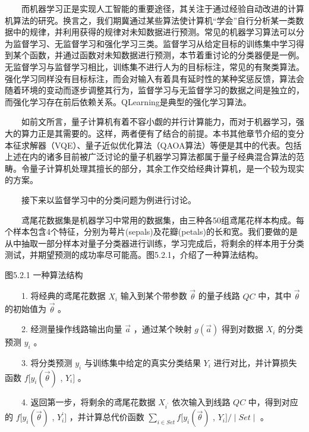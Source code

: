 \documentclass[a4paper,11pt,english]{sphinxmanual}
\let\sphinxpxdimen\pdfpxdimen\else\newdimen\sphinxpxdimen
\begin{document}
\sphinxAtStartPar
  而机器学习正是实现人工智能的重要途径，其关注于通过经验自动改进的计算机算法的研究。换言之，我们期冀通过某些算法使计算机“学会”自行分析某一类数据中的规律，并利用获得的规律对未知数据进行预测。常见的机器学习算法可以分为监督学习、无监督学习和强化学习三类。监督学习从给定目标的训练集中学习得到某个函数，并通过函数对未知数据进行预测，本节着重讨论的分类器便是一例。无监督学习与监督学习相比，训练集不进行人为的目标标注，常见的有聚类算法。强化学习同样没有目标标注，而会对输入有着具有延时性的某种奖惩反馈，算法会随着环境的变动而逐步调整其行为，监督学习与无监督学习的数据之间是独立的，而强化学习存在前后依赖关系。Q\sphinxhyphen{}Learning是典型的强化学习算法。

\sphinxAtStartPar
  如前文所言，量子计算机有着不容小觑的并行计算能力，而对于机器学习，强大的算力正是其需要的。这样，两者便有了结合的前提。本书其他章节介绍的变分本征求解器（VQE）、量子近似优化算法（QAOA算法）等便是其中的代表。包括上述在内的诸多目前被广泛讨论的量子机器学习算法都属于量子\sphinxhyphen{}经典混合算法的范畴。令量子计算机处理其擅长的部分，其余工作交给经典计算机，是一个较为现实的方案。

\sphinxAtStartPar
  接下来以监督学习中的分类问题为例进行讨论。

\sphinxAtStartPar
  鸢尾花数据集是机器学习中常用的数据集，由三种各50组鸢尾花样本构成。每个样本包含4个特征，分别为萼片(sepals)及花瓣(petals)的长和宽。我们要做的是从中抽取一部分样本对量子分类器进行训练，学习完成后，将剩余的样本用于分类测试，并期望预测的成功率尽可能高。图5.2.1，介绍了一种算法结构。

\noindent{\hspace*{\fill}\sphinxincludegraphics[width=700\sphinxpxdimen]{{5.2.1}.png}\hspace*{\fill}}

\begin{center}图5.2.1  一种算法结构
\end{center}
\sphinxAtStartPar
  1. 将经典的鸢尾花数据 \(X_{i}\) 输入到某个带参数 \(\vec{\theta}\) 的量子线路  \(Q C\) 中，其中  \(\vec{\theta}\) 的初始值为  \(\vec{\theta}\) 。

\sphinxAtStartPar
  2. 经测量操作线路输出向量  \(\vec{a}\) ，通过某个映射  \(g(\vec{a})\) 得到对数据  \(X_{i}\) 的分类预测  \(y_{i}\)  。

\sphinxAtStartPar
  3. 将分类预测  \(y_{i}\) 与训练集中给定的真实分类结果  \(Y_{i}\) 进行对比，并计算损失函数  \(f[y_{i}(\vec{\theta})\) , \(Y_{i}]\) 。

\sphinxAtStartPar
  4. 返回第一步，将剩余的鸢尾花数据  \(X_{i^{'}}\) 依次输入到线路  \(Q C\) 中，得到对应的 \(f[y_{i}(\vec{\theta})\) , \(Y_{i}^{\prime}]\) ，并计算总代价函数  \(\sum_{i \in S e t} f[y_{i}(\vec{\theta})\) , \(Y_{i}] / \mid Set \mid\) 。
\end{document}
